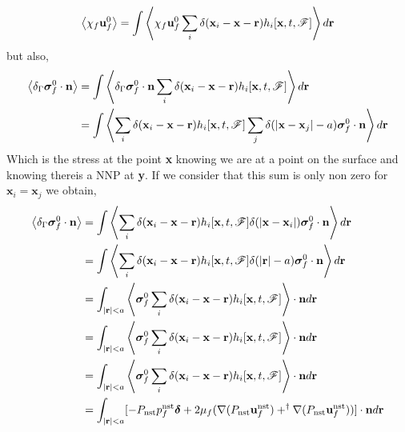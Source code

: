 \documentclass[12pt]{My_preprint}
\begin{document}
\begin{equation}
    \left<\chi_f \textbf{u}_f^0 \right>
    = 
    \int \left<\chi_f \textbf{u}_f^0 \sum_i \delta(\textbf{x}_i - \textbf{x} - \textbf{r}) h_i[\textbf{x},t,\mathscr{F}]\right>
    d\textbf{r}
\end{equation}
but also, 
\begin{align}
    \left<\delta_\Gamma \bm\sigma_f^0\cdot \textbf{n} \right>
    &= 
    \int \left<\delta_\Gamma \bm\sigma_f^0\cdot \textbf{n} \sum_i \delta(\textbf{x}_i - \textbf{x} - \textbf{r}) h_i[\textbf{x},t,\mathscr{F}]\right>
    d\textbf{r}\\
    &= 
    \int \left<\sum_i \delta(\textbf{x}_i - \textbf{x} - \textbf{r}) h_i[\textbf{x},t,\mathscr{F}] \sum_j \delta(|\textbf{x} - \textbf{x}_j|-a)\bm\sigma_f^0\cdot \textbf{n}\right>
    d\textbf{r}
\end{align}
Which is the stress at the point \textbf{x} knowing we are at a point on the surface and knowing thereis a NNP at \textbf{y}. 
If we consider that this sum is only non zero for $\textbf{x}_i = \textbf{x}_j$ we obtain, 
\begin{align}
    \left<\delta_\Gamma \bm\sigma_f^0\cdot \textbf{n} \right>
    &= 
    \int \left<\sum_i \delta(\textbf{x}_i - \textbf{x} - \textbf{r}) h_i[\textbf{x},t,\mathscr{F}]  \delta(|\textbf{x} - \textbf{x}_i|)\bm\sigma_f^0\cdot \textbf{n}\right>
    d\textbf{r}\\
    &= 
    \int \left<\sum_i \delta(\textbf{x}_i - \textbf{x} - \textbf{r}) h_i[\textbf{x},t,\mathscr{F}]  \delta(|\textbf{r}|-a)\bm\sigma_f^0\cdot \textbf{n}\right>
    d\textbf{r}\\
    &= 
    \int_{|\textbf{r}|<a}  
    \left<\bm\sigma_f^0 \sum_i \delta(\textbf{x}_i - \textbf{x} - \textbf{r}) h_i[\textbf{x},t,\mathscr{F}] \right>
    \cdot \textbf{n} d\textbf{r}\\
    &= 
    \int_{|\textbf{r}|<a}  
    \left<\bm\sigma_f^0 \sum_i \delta(\textbf{x}_i - \textbf{x} - \textbf{r}) h_i[\textbf{x},t,\mathscr{F}] \right>
    \cdot \textbf{n} d\textbf{r}\\
    &= 
    \int_{|\textbf{r}|<a}  
    \left<\bm\sigma_f^0 \sum_i \delta(\textbf{x}_i - \textbf{x} - \textbf{r}) h_i[\textbf{x},t,\mathscr{F}] \right>
    \cdot \textbf{n} d\textbf{r}\\
    &= 
    \int_{|\textbf{r}|<a}  
    [- P_\text{nst} p^\text{nst}_f \bm\delta 
    +2\mu_f  (\mathbf{\nabla} (P_\text{nst}\textbf{u}_f^\text{nst})+^\dagger \mathbf{\nabla} (P_\text{nst}\textbf{u}_f^\text{nst})) 
    ]\cdot \textbf{n} d\textbf{r}
\end{align}


\appendix
\end{document}
